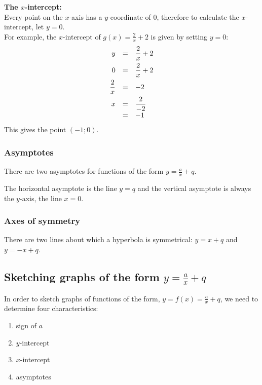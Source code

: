 \textbf{The $x$-intercept:} \\
Every point on the $x$-axis has a $y$-coordinate of $0$, therefore to calculate the $x$-intercept, let $y=0$.\\
For example, the $x$-intercept of $g(x)=\frac{2}{x}+2$ is given by setting $y=0$:
\begin{equation*}
\begin{array}{ccl}
\hfill y& =& \dfrac{2}{x}+2\hfill \vspace{4pt}\\
 \hfill 0& =& \dfrac{2}{x}+2\hfill \vspace{4pt} \\
 \hfill \dfrac{2}{x}& =& -2\hfill \vspace{4pt}\\
 \hfill x& =& \dfrac{2}{-2}\hfill \\
 &=& -1\hfill
\end{array}
\end{equation*}
This gives the point $(-1; 0)$.


\subsubsection*{Asymptotes}

There are two asymptotes for functions of the form $y=\frac{a}{x}+q$. \par 
The horizontal asymptote is the line $y=q$ and the vertical asymptote is always the $y$-axis, the line $x=0$. 

\subsubsection*{Axes of symmetry}
There are two lines about which a hyperbola is symmetrical: $y=x+q$ and $y = -x +q$.


\subsection*{Sketching graphs of the form $y=\frac{a}{x}+q$}

In order to sketch graphs of functions of the form, $y=f(x)=\frac{a}{x}+q$, we need to determine four characteristics:
\\
\begin{enumerate}[noitemsep, label=\textbf{\arabic*}. ] 
\item sign of $a$
\item $y$-intercept
\item $x$-intercept
\item asymptotes
\end{enumerate}

